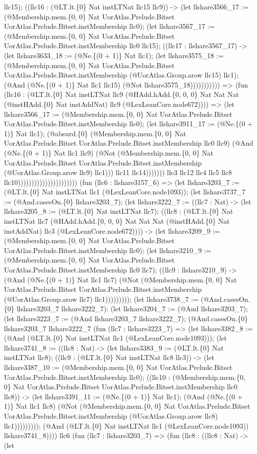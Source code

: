 \documentclass[11pt]{article}
\begin{document}
llc15); ((llc16 : (@LT.lt.\{0\} Nat instLTNat llc15 llc9)) -> (let llshare3566\_17 := (@Membership.mem.\{0, 0\} Nat UorAtlas.Prelude.Bitset UorAtlas.Prelude.Bitset.instMembership llc0); (let llshare3567\_17 := (@Membership.mem.\{0, 0\} Nat UorAtlas.Prelude.Bitset UorAtlas.Prelude.Bitset.instMembership llc0 llc15); ((llc17 : llshare3567\_17) -> (let llshare3633\_18 := (@Ne.\{(0 + 1)\} Nat llc1); (let llshare3575\_18 := (@Membership.mem.\{0, 0\} Nat UorAtlas.Prelude.Bitset UorAtlas.Prelude.Bitset.instMembership (@UorAtlas.Group.arow llc15) llc1); (@And (@Ne.\{(0 + 1)\} Nat llc1 llc15) (@Not llshare3575\_18))))))))))) => (fun (llc16 : (@LT.lt.\{0\} Nat instLTNat llc9 (@HAdd.hAdd.\{0, 0, 0\} Nat Nat Nat (@instHAdd.\{0\} Nat instAddNat) llc9 (@LexLeanCore.node672)))) => (let llshare3566\_17 := (@Membership.mem.\{0, 0\} Nat UorAtlas.Prelude.Bitset UorAtlas.Prelude.Bitset.instMembership llc0); (let llshare3911\_17 := (@Ne.\{(0 + 1)\} Nat llc1); (@absurd.\{0\} (@Membership.mem.\{0, 0\} Nat UorAtlas.Prelude.Bitset UorAtlas.Prelude.Bitset.instMembership llc0 llc9) (@And (@Ne.\{(0 + 1)\} Nat llc1 llc9) (@Not (@Membership.mem.\{0, 0\} Nat UorAtlas.Prelude.Bitset UorAtlas.Prelude.Bitset.instMembership (@UorAtlas.Group.arow llc9) llc1))) llc11 llc14))))))) llc3 llc12 llc4 llc5 llc8 llc10)))))))))))))))))))))) (fun (llc6 : llshare3157\_6) => (let llshare3203\_7 := (@LT.lt.\{0\} Nat instLTNat llc1 (@LexLeanCore.node1093)); (let llshare3737\_7 := (@And.casesOn.\{0\} llshare3203\_7); (let llshare3222\_7 := ((llc7 : Nat) -> (let llshare3205\_8 := (@LT.lt.\{0\} Nat instLTNat llc7); ((llc8 : (@LT.lt.\{0\} Nat instLTNat llc7 (@HAdd.hAdd.\{0, 0, 0\} Nat Nat Nat (@instHAdd.\{0\} Nat instAddNat) llc3 (@LexLeanCore.node672)))) -> (let llshare3209\_9 := (@Membership.mem.\{0, 0\} Nat UorAtlas.Prelude.Bitset UorAtlas.Prelude.Bitset.instMembership llc0); (let llshare3210\_9 := (@Membership.mem.\{0, 0\} Nat UorAtlas.Prelude.Bitset UorAtlas.Prelude.Bitset.instMembership llc0 llc7); ((llc9 : llshare3210\_9) -> (@And (@Ne.\{(0 + 1)\} Nat llc1 llc7) (@Not (@Membership.mem.\{0, 0\} Nat UorAtlas.Prelude.Bitset UorAtlas.Prelude.Bitset.instMembership (@UorAtlas.Group.arow llc7) llc1))))))))); (let llshare3738\_7 := (@And.casesOn.\{0\} llshare3203\_7 llshare3222\_7); (let llshare3204\_7 := (@And llshare3203\_7); (let llshare3223\_7 := (@And llshare3203\_7 llshare3222\_7); (@And.casesOn.\{0\} llshare3203\_7 llshare3222\_7 (fun (llc7 : llshare3223\_7) => (let llshare3382\_8 := (@And (@LT.lt.\{0\} Nat instLTNat llc1 (@LexLeanCore.node1093))); (let llshare3741\_8 := ((llc8 : Nat) -> (let llshare3383\_9 := (@LT.lt.\{0\} Nat instLTNat llc8); ((llc9 : (@LT.lt.\{0\} Nat instLTNat llc8 llc3)) -> (let llshare3387\_10 := (@Membership.mem.\{0, 0\} Nat UorAtlas.Prelude.Bitset UorAtlas.Prelude.Bitset.instMembership llc0); ((llc10 : (@Membership.mem.\{0, 0\} Nat UorAtlas.Prelude.Bitset UorAtlas.Prelude.Bitset.instMembership llc0 llc8)) -> (let llshare3391\_11 := (@Ne.\{(0 + 1)\} Nat llc1); (@And (@Ne.\{(0 + 1)\} Nat llc1 llc8) (@Not (@Membership.mem.\{0, 0\} Nat UorAtlas.Prelude.Bitset UorAtlas.Prelude.Bitset.instMembership (@UorAtlas.Group.arow llc8) llc1))))))))); (@And (@LT.lt.\{0\} Nat instLTNat llc1 (@LexLeanCore.node1093)) llshare3741\_8)))) llc6 (fun (llc7 : llshare3203\_7) => (fun (llc8 : ((llc8 : Nat) -> (let 
\end{document}
